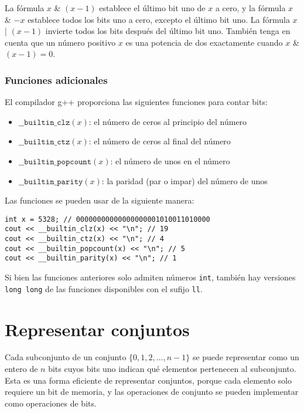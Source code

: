La fórmula $x$ \& $(x-1)$ establece el último
bit uno de $x$ a cero,
y la fórmula $x$ \& $-x$ establece todos los
bits uno a cero, excepto el último bit uno.
La fórmula $x$ | $(x-1)$
invierte todos los bits después del último bit uno.
También tenga en cuenta que un número positivo $x$ es
una potencia de dos exactamente cuando $x$ \& $(x-1) = 0$.

\subsubsection*{Funciones adicionales}

El compilador g++ proporciona las siguientes
funciones para contar bits:

\begin{itemize}
\item
$\texttt{\_\_builtin\_clz}(x)$:
el número de ceros al principio del número
\item
$\texttt{\_\_builtin\_ctz}(x)$:
el número de ceros al final del número
\item
$\texttt{\_\_builtin\_popcount}(x)$:
el número de unos en el número
\item
$\texttt{\_\_builtin\_parity}(x)$:
la paridad (par o impar) del número de unos
\end{itemize}
\begin{samepage}

Las funciones se pueden usar de la siguiente manera:
\begin{lstlisting}
int x = 5328; // 00000000000000000001010011010000
cout << __builtin_clz(x) << "\n"; // 19
cout << __builtin_ctz(x) << "\n"; // 4
cout << __builtin_popcount(x) << "\n"; // 5
cout << __builtin_parity(x) << "\n"; // 1
\end{lstlisting}
\end{samepage}

Si bien las funciones anteriores solo admiten números \texttt{int},
también hay versiones \texttt{long long} de
las funciones disponibles con el sufijo \texttt{ll}.

\section{Representar conjuntos}

Cada subconjunto de un conjunto
$\{0,1,2,\ldots,n-1\}$
se puede representar como un entero de $n$ bits
cuyos bits uno indican qué
elementos pertenecen al subconjunto.
Esta es una forma eficiente de representar conjuntos,
porque cada elemento solo requiere un bit de memoria,
y las operaciones de conjunto se pueden implementar como operaciones de bits.

